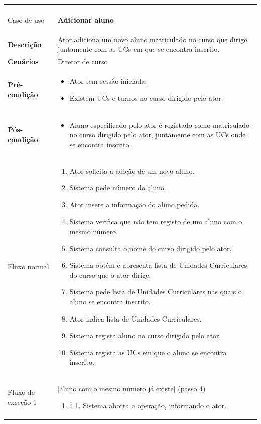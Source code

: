 \documentclass[12pt, a4paper]{article}
\newenvironment{condition}{
    \begin{itemize}[wide=0pt]
        \vspace{-0.2cm}
}{
        \vspace{-0.5cm}
    \end{itemize}
}
\newcommand\flow[1]{
    Fluxo normal &
    \vspace{-0.9cm}
    \singlespacing
    \begin{enumerate}[wide=0pt]
        #1
        \vspace{-0.3cm}
    \end{enumerate} \\ \hline
}
\newcommand\otherflow[3]{
    #1 &
    #2
    \singlespacing
    \begin{enumerate}[wide=0pt]
        #3
        \vspace{-0.3cm}
    \end{enumerate} \\ \hline
}
\newenvironment{usecase}[5]{
    \begin{longtable}{|>{\centering\arraybackslash\bf}m{3cm}|m{13cm}|}
        \multicolumn{2}{c}{\ldots Continua \ldots} \\
        \endfoot
        \endlastfoot

        \hline
        Caso de uso & \textbf{#1} \\

        \hline
        Descrição & #2 \\

        \hline
        Cenários & #3 \\

        \hline
        Pré-condição &
        \vspace{-0.8cm}
        \begin{condition}
            #4
        \end{condition} \\

        \hline
        Pós-condição &
        \vspace{-0.8cm}
        \begin{condition}
            #5
        \end{condition} \\

        \hline
}{
\end{longtable}
}
\begin{document}
\begin{usecase}
    {Adicionar aluno}
    {Ator adiciona um novo aluno matriculado no curso que dirige, juntamente com as UCs em que se
        encontra inscrito.}
    {Diretor de curso}
    {
        \item Ator tem sessão iniciada;
        \item Existem UCs e turnos no curso dirigido pelo ator.
    }
    {
        \item Aluno especificado pelo ator é registado como matriculado no curso dirigido pelo ator,
        juntamente com as UCs onde se encontra inscrito.
    }

    \flow{
        \item Ator solicita a adição de um novo aluno.
        \item Sistema pede número do aluno.
        \item Ator insere a informação do aluno pedida.
        \item Sistema verifica que não tem registo de um aluno com o mesmo número.
        \item Sistema consulta o nome do curso dirigido pelo ator.
        \item Sistema obtém e apresenta lista de Unidades Curriculares do curso que o ator dirige.
        \item Sistema pede lista de Unidades Curriculares nas quais o aluno se encontra inscrito.
        \item Ator indica lista de Unidades Curriculares.
        \item Sistema regista aluno no curso dirigido pelo ator.
        \item Sistema regista as UCs em que o aluno se encontra inscrito.
    }

    \otherflow{Fluxo de exceção 1}
        {[aluno com o mesmo número já existe] (passo 4)}{

        \item[4.1.] Sistema aborta a operação, informando o ator.
    }
\end{usecase}
\end{document}
